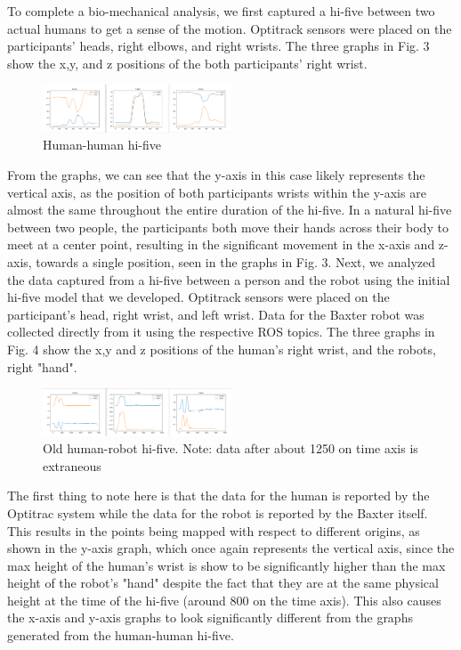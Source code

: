 \documentclass[letterpaper, 10 pt, conference]{ieeeconf}  %
\begin{document}
To complete a bio-mechanical analysis, we first captured a hi-five between two actual humans to get a sense of the motion. Optitrack sensors were placed on the participants' heads, right elbows, and right wrists. The three graphs in Fig. 3 show the x,y, and z positions of the both participants' right wrist. 
\begin{figure}[h]
\centering
\includegraphics[width=0.5\textwidth]{biomechanics.png}
\caption{Human-human hi-five}
\end{figure} 
\newline
\indent From the graphs, we can see that the y-axis in this case likely represents the vertical axis, as the position of both participants wrists within the y-axis are almost the same throughout the entire duration of the hi-five. In a natural hi-five between two people, the participants both move their hands across their body to meet at a center point, resulting in the significant movement in the x-axis and z-axis, towards a single position, seen in the graphs in Fig. 3.
\newline
\indent Next, we analyzed the data captured from a hi-five between a person and the robot using the initial hi-five model that we developed. Optitrack sensors were placed on the participant's head, right wrist, and left wrist. Data for the Baxter robot was collected directly from it using the respective ROS topics. The three graphs in Fig. 4 show the x,y and z positions of the human's right wrist, and the robots, right "hand".
\begin{figure}[h]
\centering
\includegraphics[width=0.5\textwidth]{oldfive.png}
\caption{Old human-robot hi-five. Note: data after about 1250 on time axis is extraneous}
\end{figure}
\newline
\indent The first thing to note here is that the data for the human is reported by the Optitrac system while the data for the robot is reported by the Baxter itself. This results in the points being mapped with respect to different origins, as shown in the y-axis graph, which once again represents the vertical axis, since the max height of the human's wrist is show to be significantly higher than the max height of the robot's "hand" despite the fact that they are at the same physical height at the time of the hi-five (around 800 on the time axis). This also causes the x-axis and y-axis graphs to look significantly different from the graphs generated from the human-human hi-five. 
\end{document}
